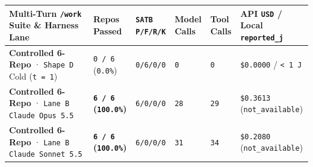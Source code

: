 \documentclass[10pt,letterpaper]{article}
\newcounter{none}
\begin{document}
{\def\LTcaptype{none} %
{\scriptsize\setlength{\tabcolsep}{3.0pt}\renewcommand{\arraystretch}{1.14}
\begin{longtable}[]{@{}
  >{\raggedright\arraybackslash}p{}
  >{\raggedleft\arraybackslash}p{}
  >{\centering\arraybackslash}p{}
  >{\raggedleft\arraybackslash}p{}
  >{\raggedleft\arraybackslash}p{}
  >{\raggedright\arraybackslash}p{}@{}}
\toprule\noalign{}
\begin{minipage}[b]{\linewidth}\raggedright
\textbf{Multi-Turn \texttt{/work} Suite \& Harness Lane}
\end{minipage} & \begin{minipage}[b]{\linewidth}\raggedleft
\textbf{Repos Passed}
\end{minipage} & \begin{minipage}[b]{\linewidth}\centering
\textbf{\texttt{SATB} \texttt{P/F/R/K}}
\end{minipage} & \begin{minipage}[b]{\linewidth}\raggedleft
\textbf{Model Calls}
\end{minipage} & \begin{minipage}[b]{\linewidth}\raggedleft
\textbf{Tool Calls}
\end{minipage} & \begin{minipage}[b]{\linewidth}\raggedright
\textbf{API \texttt{USD} / Local \texttt{reported\_\allowbreak{}j}}
\end{minipage} \\
\midrule\noalign{}
\endhead
\bottomrule\noalign{}
\endlastfoot
\textbf{Controlled 6-Repo} · \texttt{Shape\ D} Cold (\texttt{t\ =\ 1}) &
\texttt{0\ /\ 6} (\texttt{0.0\%}) & \texttt{0/6/0/0} & \texttt{0} &
\texttt{0} & \texttt{\$0.0000} / \texttt{\textless{}\ 1\ J} \\
\textbf{Controlled 6-Repo} · \texttt{Lane\ B} \texttt{Claude\ Opus\ 5.\allowbreak{}5}
& \textbf{\texttt{6\ /\ 6} (\texttt{100.0\%})} & \texttt{6/0/0/0} &
\texttt{28} & \texttt{29} & \texttt{\$0.3613}
(\texttt{not\_\allowbreak{}available}) \\
\textbf{Controlled 6-Repo} · \texttt{Lane\ B}
\texttt{Claude\ Sonnet\ 5.\allowbreak{}5} & \textbf{\texttt{6\ /\ 6}
(\texttt{100.0\%})} & \texttt{6/0/0/0} & \texttt{31} & \texttt{34} &
\texttt{\$0.2080} (\texttt{not\_\allowbreak{}available}) \\

\end{longtable}}}
\end{document}
